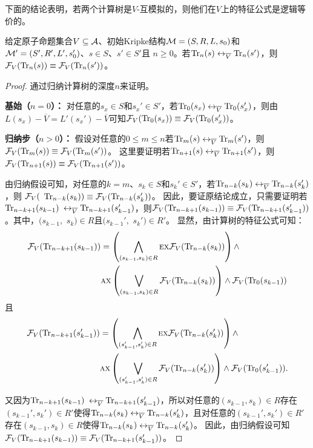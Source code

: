 下面的结论表明，若两个计算树是$V$-互模拟的，则他们在$V$上的特征公式是逻辑等价的。
\begin{lemma}\label{lem:Vb:TrFormula:Equ}
	给定原子命题集合$V\subseteq {\cal A}$、初始Kripke结构${\cal M}=(S,R,L,s_0)$和${\cal M}'=(S',R',L',s_0')$、$s\in S$、$s'\in S'$且 $n\ge 0$。若$\textrm{Tr}_n(s) \leftrightarrow_{\overline V} \textrm{Tr}_n(s')$，则${\cal F}_V(\textrm{Tr}_n(s)) \equiv {\cal F}_V(\textrm{Tr}_n(s'))$。
\end{lemma}
\begin{proof}
	通过归纳计算树的深度$n$来证明。
	
	\textbf{基始（$n=0$）：} 对任意的$s_x\in S$和$s_x' \in S'$，若$\textrm{Tr}_0(s_x) \leftrightarrow_{\overline V} \textrm{Tr}_0(s_x')$，则由$L(s_x) - \overline V = L'(s_x') - \overline V$可知${\cal F}_V(\textrm{Tr}_0(s_x)) \equiv {\cal F}_V(\textrm{Tr}_0(s_x'))$。
	
	\textbf{归纳步（$n>0$）：} 假设对任意的$0\leq m \leq n$若$\textrm{Tr}_m(s) \leftrightarrow_{\overline V} \textrm{Tr}_m(s')$，则${\cal F}_V(\textrm{Tr}_m(s)) \equiv {\cal F}_V(\textrm{Tr}_m(s'))$。
	这里要证明若$\textrm{Tr}_{n+1}(s) \leftrightarrow_{\overline V} \textrm{Tr}_{n+1}(s')$，则${\cal F}_V(\textrm{Tr}_{n+1}(s)) \equiv {\cal F}_V(\textrm{Tr}_{n+1}(s'))$。
	
	由归纳假设可知，对任意的$k=m$、$s_k\in S$和$s_k'\in S'$，若$\textrm{Tr}_{n-k}(s_k) \leftrightarrow_{\overline V} \textrm{Tr}_{n-k}(s_k')$，则 ${\cal F}_V($ $\textrm{Tr}_{n-k}(s_k)) \equiv {\cal F}_V(\textrm{Tr}_{n-k}(s_k'))$。
	因此，要证原结论成立，只需要证明若$\textrm{Tr}_{n-k+1}(s_{k-1})$ $\leftrightarrow_{\overline V} \textrm{Tr}_{n-k+1}(s_{k-1}')$，则${\cal F}_V(\textrm{Tr}_{n-k+1}(s_{k-1})) \equiv {\cal F}_V(\textrm{Tr}_{n-k+1}(s_{k-1}'))$。其中，$(s_{k-1},$ $s_k)\in R$且$(s_{k-1}',$ $s_k')\in R'$。
	显然，由计算树的特征公式可知：
	\begin{align*}
		{\cal F}_V(\textrm{Tr}_{n-k+1}(s_{k-1})) &  =
		\left(\bigwedge_{(s_{k-1},s_k)\in R}
		\textsc{e} \textsc{x} {\cal F}_V(\textrm{Tr}_{n-k}(s_k))\right)
		\wedge \\
		&\textsc{a} \textsc{x}\left(\bigvee_{(s_{k-1},s_k)\in R}
		{\cal F}_V(\textrm{Tr}_{n-k}(s_k) )\right)
		\wedge {\cal F}_V(\textrm{Tr}_0(s_{k-1}))
	\end{align*}
	且
	\begin{align*}
		{\cal F}_V(\textrm{Tr}_{n-k+1}(s_{k-1}')) &  =
		\left(\bigwedge_{(s_{k-1}',s_k')\in R}
		\textsc{e} \textsc{x} {\cal F}_V(\textrm{Tr}_{n-k}(s_k'))\right)
		\wedge \\
		&\textsc{a} \textsc{x}\left(\bigvee_{(s_{k-1}',s_k')\in R}
		{\cal F}_V(\textrm{Tr}_{n-k}(s_k') )\right)
		\wedge {\cal F}_V(\textrm{Tr}_0(s_{k-1}')).
	\end{align*} 

	又因为$\textrm{Tr}_{n-k+1}(s_{k-1})$ $\leftrightarrow_{\overline V} \textrm{Tr}_{n-k+1}(s_{k-1}')$，所以对任意的$(s_{k-1}, s_k) \in R$存在$(s_{k-1}', s_k') \in R'$使得$\textrm{Tr}_{n-k}(s_k) \leftrightarrow_{\overline V} \textrm{Tr}_{n-k}(s_k')$，且对任意的$(s_{k-1}', s_k') \in R'$存在$(s_{k-1}, s_k) \in R$使得$\textrm{Tr}_{n-k}(s_k) \leftrightarrow_{\overline V} \textrm{Tr}_{n-k}(s_k')$。
	因此，由归纳假设可知${\cal F}_V(\textrm{Tr}_{n-k+1}(s_{k-1})) \equiv {\cal F}_V(\textrm{Tr}_{n-k+1}(s_{k-1}'))$。
\end{proof}

